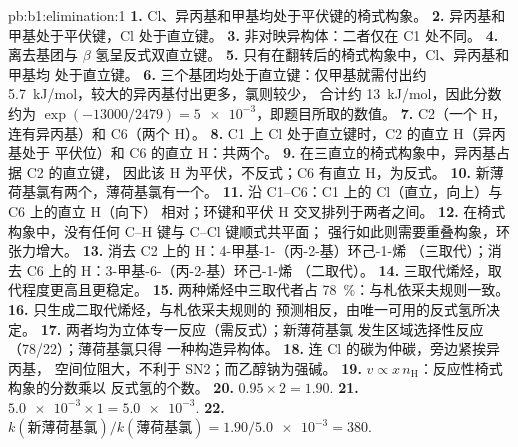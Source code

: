 \begin{solution}{pb:b1:elimination:1}
\textbf{1.} Cl、异丙基和甲基均处于平伏键的椅式构象。
\textbf{2.} 异丙基和甲基处于平伏键，Cl 处于直立键。
\textbf{3.} 非对映异构体：二者仅在 C1 处不同。
\textbf{4.} 离去基团与 $\beta$ 氢呈反式双直立键。
\textbf{5.} 只有在翻转后的椅式构象中，Cl、异丙基和甲基均
处于直立键。
\textbf{6.} 三个基团均处于直立键：仅甲基就需付出约
\qty{5.7}{kJ/mol}，较大的异丙基付出更多，氯则较少，
合计约 \qty{13}{kJ/mol}，因此分数约为
$\exp(-13000/2479) = \num{5e-3}$，即题目所取的数值。
\textbf{7.} C2（一个 H，连有异丙基）和 C6（两个 H）。
\textbf{8.} C1 上 Cl 处于直立键时，C2 的直立 H（异丙基处于
平伏位）和 C6 的直立 H：共两个。
\textbf{9.} 在三直立的椅式构象中，异丙基占据 C2 的直立键，
因此该 H 为平伏，不反式；C6 有直立 H，为反式。
\textbf{10.} 新薄荷基氯有两个，薄荷基氯有一个。
\textbf{11.} 沿 C1--C6：C1 上的 Cl（直立，向上）与 C6 上的直立 H（向下）
相对；环键和平伏 H 交叉排列于两者之间。
\textbf{12.} 在椅式构象中，没有任何 C--H 键与 C--Cl 键顺式共平面；
强行如此则需要重叠构象，环张力增大。
\textbf{13.} 消去 C2 上的 H：4-甲基-1-（丙-2-基）环己-1-烯
（三取代）；消去 C6 上的 H：3-甲基-6-（丙-2-基）环己-1-烯
（二取代）。
\textbf{14.} 三取代烯烃，取代程度更高且更稳定。
\textbf{15.} 两种烯烃中三取代者占 \qty{78}{\percent}：与札依采夫规则一致。
\textbf{16.} 只生成二取代烯烃，与札依采夫规则的
预测相反，由唯一可用的反式氢所决定。
\textbf{17.} 两者均为立体专一反应（需反式）；新薄荷基氯
发生区域选择性反应（78/22）；薄荷基氯只得
一种构造异构体。
\textbf{18.} 连 Cl 的碳为仲碳，旁边紧挨异丙基，
空间位阻大，不利于 SN2；而乙醇钠为强碱。
\textbf{19.} $v \propto x\,n_{\mathrm{H}}$：反应性椅式构象的分数乘以
反式氢的个数。
\textbf{20.} $0.95 \times 2 = 1.90$.
\textbf{21.} $\num{5.0e-3} \times 1 = \num{5.0e-3}$.
\textbf{22.} \textbf{$k(\text{新薄荷基氯})/k(\text{薄荷基氯}) = 1.90/\num{5.0e-3}
= 380$}.
\end{solution}
